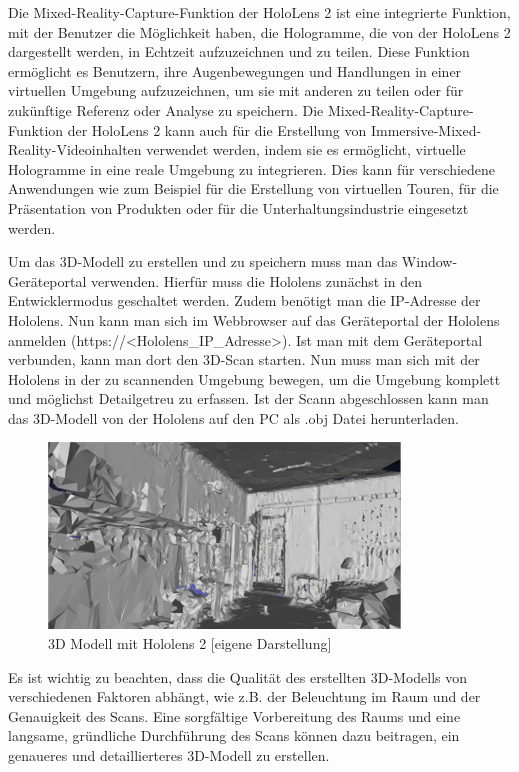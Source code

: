         Die Mixed-Reality-Capture-Funktion der HoloLens 2 ist eine integrierte Funktion, mit der Benutzer die Möglichkeit haben, die Hologramme, die von der HoloLens 2 dargestellt werden, in Echtzeit aufzuzeichnen und zu teilen. Diese Funktion ermöglicht es Benutzern, ihre Augenbewegungen und Handlungen in einer virtuellen Umgebung aufzuzeichnen, um sie mit anderen zu teilen oder für zukünftige Referenz oder Analyse zu speichern. Die Mixed-Reality-Capture-Funktion der HoloLens 2 kann auch für die Erstellung von Immersive-Mixed-Reality-Videoinhalten verwendet werden, indem sie es ermöglicht, virtuelle Hologramme in eine reale Umgebung zu integrieren. Dies kann für verschiedene Anwendungen wie zum Beispiel für die Erstellung von virtuellen Touren, für die Präsentation von Produkten oder für die Unterhaltungsindustrie eingesetzt werden.

        Um das 3D-Modell zu erstellen und zu speichern muss man das Window-Geräteportal verwenden. Hierfür muss die Hololens zunächst in den Entwicklermodus geschaltet werden. Zudem benötigt man die IP-Adresse der Hololens. Nun kann man sich im Webbrowser auf das Geräteportal der Hololens anmelden (https://<Hololens\_IP\_Adresse>). Ist man mit dem Geräteportal verbunden, kann man dort den 3D-Scan starten. Nun muss man sich mit der Hololens in der zu scannenden Umgebung bewegen, um die Umgebung komplett und möglichst Detailgetreu zu erfassen. Ist der Scann abgeschlossen kann man das 3D-Modell von der Hololens auf den PC als .obj Datei herunterladen.

        \begin{figure}[H]
            \centering
            \includegraphics[scale=1]{images/modell_zimmer_hololens.png}
            \caption[3D Modell mit Hololens 2]{\label{img modell_hololens} 3D Modell mit Hololens 2 [eigene Darstellung]}
        \end{figure}

        Es ist wichtig zu beachten, dass die Qualität des erstellten 3D-Modells von verschiedenen Faktoren abhängt, wie z.B. der Beleuchtung im Raum und der Genauigkeit des Scans. Eine sorgfältige Vorbereitung des Raums und eine langsame, gründliche Durchführung des Scans können dazu beitragen, ein genaueres und detaillierteres 3D-Modell zu erstellen.
